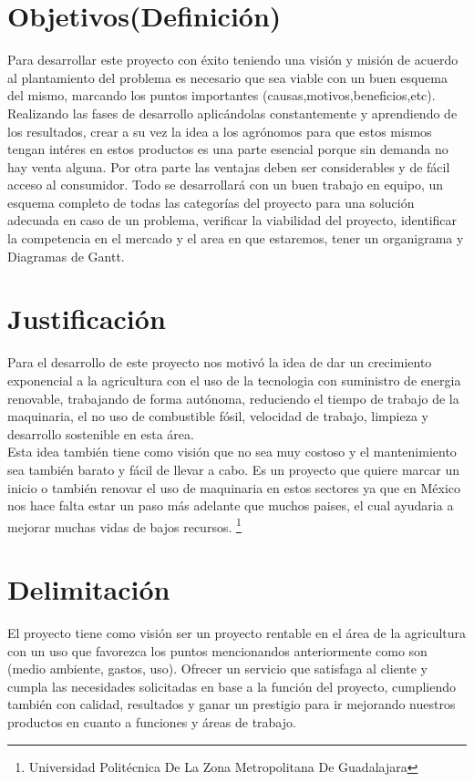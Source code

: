 \documentclass[11pt,a4paper]{article}
\begin{document}
\section{Objetivos(Definición)}

Para desarrollar este proyecto con éxito teniendo una visión y misión de acuerdo al plantamiento del problema es necesario que sea viable con un buen esquema del mismo, marcando los puntos importantes (causas,motivos,beneficios,etc). Realizando las fases de desarrollo aplicándolas constantemente y aprendiendo de los resultados, crear a su vez la idea a los agrónomos para que estos mismos tengan intéres en estos productos es una parte esencial porque sin demanda no hay venta alguna. Por otra parte las ventajas deben ser considerables y de fácil acceso al consumidor.
Todo se desarrollará con un buen trabajo en equipo, un esquema completo de todas las categorías del proyecto para una solución adecuada en caso de un problema, verificar la viabilidad del proyecto, identificar la competencia en el mercado y el area en que estaremos, tener un organigrama y Diagramas de Gantt.

\section{Justificación}
 Para el desarrollo de este proyecto nos motivó la idea de dar un crecimiento exponencial a la agricultura con el uso de la tecnologia con suministro de energia renovable, trabajando de forma autónoma, reduciendo el tiempo de trabajo de la maquinaria, el no uso de combustible fósil, velocidad de trabajo, limpieza y desarrollo sostenible en esta área.\\
Esta idea también tiene como visión que no sea muy costoso y el mantenimiento sea también barato y fácil de llevar a cabo. Es un proyecto que quiere marcar un inicio o también renovar el uso de maquinaria en estos sectores ya que en México nos hace falta estar un paso más adelante que muchos paises, el cual ayudaria a mejorar muchas vidas de bajos recursos.
 \footnote{Universidad Politécnica De La Zona Metropolitana De Guadalajara} 
 
\newpage
 
 \section{Delimitación}
 El proyecto tiene como visión ser un proyecto rentable en el área de la agricultura con un uso que favorezca los puntos mencionandos anteriormente como son (medio ambiente, gastos, uso). Ofrecer un servicio que satisfaga al cliente y cumpla las necesidades solicitadas en base a la función del proyecto, cumpliendo también con calidad, resultados y ganar un prestigio para ir mejorando nuestros productos en cuanto a funciones y áreas de trabajo.\\
\end{document}

